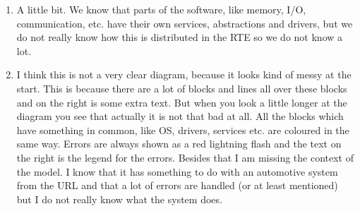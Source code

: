 \begin{enumerate}
	\item A little bit.
	We know that parts of the software, like memory, I/O, communication, etc. have their own services, abstractions and drivers, but we do not really know how this is distributed in the RTE so we do not know a lot.
	
	\item I think this is not a very clear diagram, because it looks kind of messy at the start.
	This is because there are a lot of blocks and lines all over these blocks and on the right is some extra text.
	But when you look a little longer at the diagram you see that actually it is not that bad at all.
	All the blocks which have something in common, like OS, drivers, services etc. are coloured in the same way.
	Errors are always shown as a red lightning flash and the text on the right is the legend for the errors.
	Besides that I am missing the context of the model.
	I know that it has something to do with an automotive system from the URL and that a lot of errors are handled (or at least mentioned) but I do not really know what the system does.
\end{enumerate} 